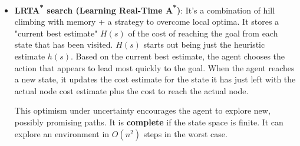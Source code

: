 \documentclass[12pt]{article}
\begin{document}
\begin{enumerate}[label=\textbf{OS.\arabic*}]
\begin{itemize}
              \item \textbf{LRTA\textsuperscript{*} search (Learning Real-Time A\textsuperscript{*})}:
                    It's a combination of hill climbing with memory + a strategy to overcome local optima.
                    It stores a "current best estimate" $H(s)$ of the cost of reaching the goal from each state that has been visited.
                    $H(s)$ starts out being just the heuristic estimate $h(s)$.
                    Based on the current best estimate, the agent chooses the action that appears to lead most quickly to the goal.
                    When the agent reaches a new state, it updates the cost estimate for the state it has just left with the actual node cost estimate plus the cost to reach the actual node.

                    This optimism under uncertainty encourages the agent to explore new, possibly promising paths.
                    It is \textbf{complete} if the state space is finite.
                    It can explore an environment in $O(n^2)$ steps in the worst case.
          \end{itemize}
\end{enumerate}
\end{document}
